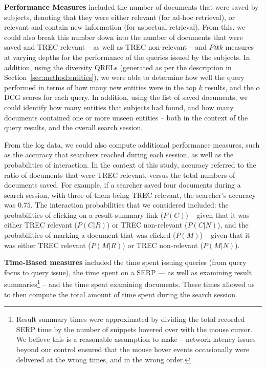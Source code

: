\noindent\textbf{Performance Measures} included the number of documents that were saved by subjects, denoting that they were either relevant (for ad-hoc retrieval), or relevant and contain new information (for aspectual retrieval). From this, we could also break this number down into the number of documents that were saved and TREC relevant -- as well as TREC non-relevant -- and $P@k$ measures at varying depths for the performance of the queries issued by the subjects. In addition, using the diversity QRELs (generated as per the description in Section~\ref{sec:method:entities}), we were able to determine how well the query performed in terms of how many new entities were in the top $k$ results, and the $\alpha$DCG scores for each query. In addition, using the list of saved documents, we could identify how many entities that subjects had found, and how many documents contained one or more unseen entities -- both in the context of the query results, and the overall search session.

\vspace*{2mm}
From the log data, we could also compute additional performance measures, such as the accuracy that searchers reached during each session, as well as the probabilities of interaction. In the context of this study, accuracy referred to the ratio of documents that were TREC relevant, versus the total numbers of documents saved. For example, if a searcher saved four documents during a search session, with three of them being TREC relevant, the searcher's accuracy was $0.75$. The interaction probabilities that we considered included: the probabilities of clicking on a result summary link ($P(C)$) -- given that it was either TREC relevant ($P(C|R)$) or TREC non-relevant ($P(C|N)$), and the probabilities of marking a document that was clicked ($P(M)$) -- given that it was either TREC relevant ($P(M|R)$) or TREC non-relevant ($P(M|N)$).

\vspace*{2mm}
\noindent\textbf{Time-Based measures} included the time spent issuing queries (from query focus to query issue), the time spent on a SERP --- as well as examining result summaries\footnote{Result summary times were approximated by dividing the total recorded SERP time by the number of snippets hovered over with the mouse cursor. We believe this is a reasonable assumption to make -- network latency issues beyond our control ensured that the mouse hover events occasionally were delivered at the wrong times, and in the wrong order.} -- and the time spent examining documents. These times allowed us to then compute the total amount of time spent during the search session.

